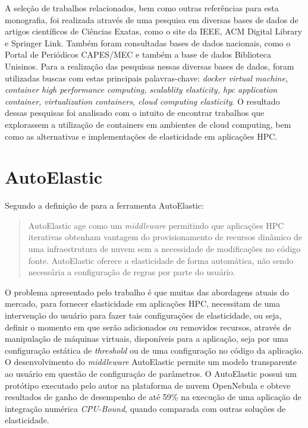 \documentclass[twoside,english,brazilian]{UNISINOSartigo}
\begin{document}
A seleção de trabalhos relacionados, bem como outras referências para esta monografia, foi realizada através de uma pesquisa em diversas bases de dados de artigos científicos de Ciências Exatas, como o site da IEEE, ACM Digital Library e Springer Link. Também foram consultadas bases de dados nacionais, como o Portal de Periódicos CAPES/MEC e também a base de dados Biblioteca Unisinos. 
Para a realização das pesquisas nessas diversas bases de dados, foram utilizadas buscas com estas principais palavras-chave: \textit{docker virtual machine, container high performance computing, scalablity elasticity, hpc application container, virtualization containers, cloud computing elasticity}. O resultado dessas pesquisas foi analisado com o intuito de encontrar trabalhos que explorassem a utilização de containers em ambientes de cloud computing, bem como as alternativas e implementações de elasticidade em aplicações HPC. 

\section{AutoElastic}
\label{autoelastic}

Segundo a definição de  para a ferramenta AutoElastic:
\begin{quote}
AutoElastic age como um \textit{middleware} permitindo que aplicações HPC iterativas obtenham vantagem do provisionamento de recursos dinâmico de uma infraestrutura de nuvem sem a necessidade de modificações no código fonte. AutoElastic oferece a elasticidade de forma automática, não sendo necessária a configuração de regras por parte do usuário.
\end{quote} 
O problema apresentado pelo trabalho é que muitas das abordagens atuais do mercado, para fornecer elasticidade em aplicações HPC, necessitam de uma intervenção do usuário para fazer tais configurações de elasticidade, ou seja, definir o momento em que serão adicionados ou removidos recursos, através de manipulação de máquinas virtuais, disponíveis para a aplicação, seja por uma configuração estática de \textit{threshold} ou de uma configuração no código da aplicação. O desenvolvimento do \textit{middleware} AutoElastic permite um modelo transparente ao usuário em questão de configuração de parâmetros. O AutoElastic possui um protótipo executado pelo autor na plataforma de nuvem OpenNebula e obteve resultados de ganho de desempenho de até 59\% na execução de uma aplicação de integração numérica \textit{CPU-Bound}, quando comparada com outras soluções de elasticidade. 
\end{document}
